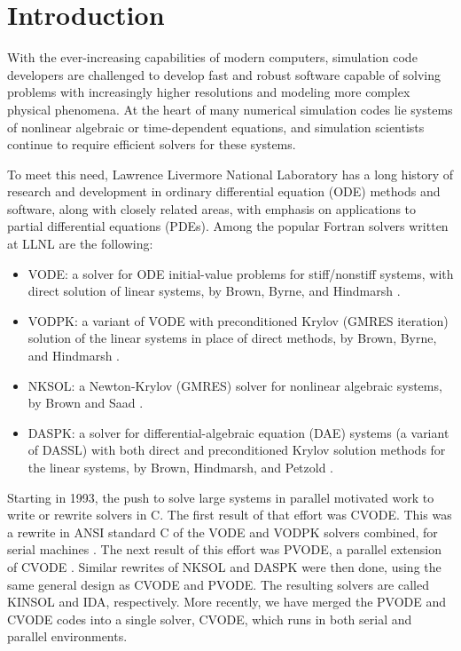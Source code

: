 \section{Introduction}

With the ever-increasing capabilities of modern computers, simulation 
code developers are challenged to develop fast and robust software 
capable of solving problems with increasingly higher resolutions and 
modeling more complex 
physical phenomena.  At the heart of many numerical simulation codes
lie systems of nonlinear algebraic or time-dependent equations, and 
simulation scientists continue to require efficient solvers for these 
systems.  

To meet this need, Lawrence Livermore National Laboratory 
has a long history of research and development in ordinary
differential equation (ODE) methods and software, along with closely related
areas, with emphasis on applications to partial differential equations
(PDEs).  Among the popular Fortran solvers written at LLNL are the
following:
\begin{itemize}
\item VODE: a solver for ODE initial-value problems for stiff/nonstiff
systems, with direct solution of linear systems, by Brown, Byrne, and
Hindmarsh \cite{BBH:89}.
\item VODPK: a variant of VODE with preconditioned Krylov (GMRES
iteration) solution of the linear systems in place of direct methods,
by Brown, Byrne, and Hindmarsh \cite{Byr:92}.
\item NKSOL: a Newton-Krylov (GMRES) solver for nonlinear algebraic
systems, by Brown and Saad \cite{BrSa:90}.
\item DASPK: a solver for differential-algebraic equation (DAE)
systems (a variant of DASSL) with both direct and preconditioned
Krylov solution methods for the linear systems, by Brown, Hindmarsh,
and Petzold \cite{BHP:94}.
\end{itemize}
Starting in 1993, the push to solve large systems in parallel
motivated work to write or rewrite solvers in C.  The first result of
that effort was CVODE.  This was a rewrite in ANSI standard C of the
VODE and VODPK solvers combined, for serial machines
\cite{CoHi:94,CoHi:96}.  The next result of this effort was PVODE, a
parallel extension of CVODE \cite{ByHi:98,ByHi:99}.
Similar rewrites of NKSOL and DASPK were then done, using the same
general design as CVODE and PVODE.  The resulting solvers are called
KINSOL and IDA, respectively.
More recently, we have merged the PVODE and CVODE codes into a 
single solver, CVODE, which runs in both serial and parallel environments. 

